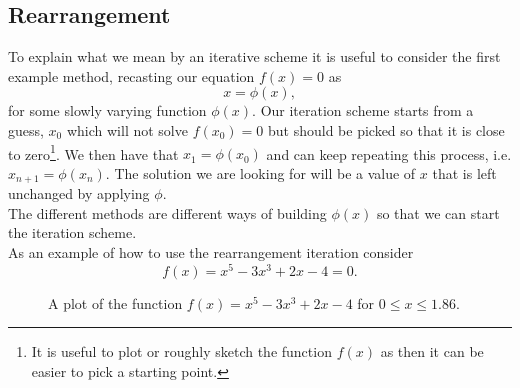 \subsection*{Rearrangement}
To explain what we mean by an iterative scheme it is useful to consider the first example method, recasting our equation $f(x)=0$ as
\begin{equation*}
x=\phi(x),
\end{equation*}
for some slowly varying function $\phi(x)$. Our iteration scheme starts from a guess, $x_{0}$ which will not solve $f(x_{0})=0$ but should be picked so that it is close to zero\footnote{It is useful to plot or roughly sketch the function $f(x)$ as then it can be easier to pick a starting point.}. We then have that $x_{1}=\phi(x_{0})$ and can keep repeating this process, i.e. $x_{n+1}=\phi(x_{n})$. The solution we are looking for will be a value of $x$ that is left unchanged by applying $\phi$. \\

The different methods are different ways of building $\phi(x)$ so that we can start the iteration scheme.\\

As an example of how to use the rearrangement iteration consider
\begin{equation}
f(x)=x^{5}-3x^3+2x-4=0.
\label{eq: equation for iterating}
\end{equation}

\begin{figure}[ht]
    \centering
{}
    \caption{A plot of the function $f(x)=x^{5}-3x^3+2x-4$ for $0\leq x\leq 1.86$.}
        \label{fig: interpolation polynomial}
\end{figure}

